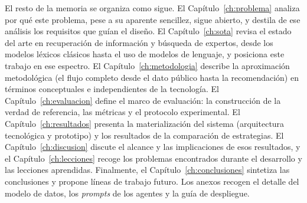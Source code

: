 El resto de la memoria se organiza como sigue.
El Capítulo~\ref{ch:problema} analiza por qué este problema, pese a su aparente sencillez, sigue abierto, y destila de ese análisis los requisitos que guían el diseño.
El Capítulo~\ref{ch:sota} revisa el estado del arte en recuperación de información y búsqueda de expertos, desde los modelos léxicos clásicos hasta el uso de modelos de lenguaje, y posiciona este trabajo en ese espectro.
El Capítulo~\ref{ch:metodologia} describe la aproximación metodológica (el flujo completo desde el dato público hasta la recomendación) en términos conceptuales e independientes de la tecnología.
El Capítulo~\ref{ch:evaluacion} define el marco de evaluación: la construcción de la verdad de referencia, las métricas y el protocolo experimental.
El Capítulo~\ref{ch:resultados} presenta la materialización del sistema (arquitectura tecnológica y prototipo) y los resultados de la comparación de estrategias.
El Capítulo~\ref{ch:discusion} discute el alcance y las implicaciones de esos resultados, y el Capítulo~\ref{ch:lecciones} recoge los problemas encontrados durante el desarrollo y las lecciones aprendidas.
Finalmente, el Capítulo~\ref{ch:conclusiones} sintetiza las conclusiones y propone líneas de trabajo futuro.
Los anexos recogen el detalle del modelo de datos, los \emph{prompts} de los agentes y la guía de despliegue.
